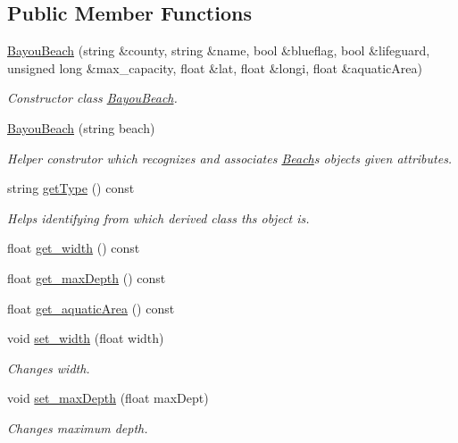 \subsection*{Public Member Functions}
\begin{DoxyCompactItemize}
\item 
\hyperlink{class_bayou_beach_a2d0c9a103748bbb90aaa772daa61f0c7}{Bayou\+Beach} (string \&county, string \&name, bool \&blueflag, bool \&lifeguard, unsigned long \&max\+\_\+capacity, float \&lat, float \&longi, float \&aquatic\+Area)
\begin{DoxyCompactList}\small\item\em Constructor class \hyperlink{class_bayou_beach}{Bayou\+Beach}. \end{DoxyCompactList}\item 
\hyperlink{class_bayou_beach_a8aa2c7bc67df6533807ef7e192ba8147}{Bayou\+Beach} (string beach)
\begin{DoxyCompactList}\small\item\em Helper construtor which recognizes and associates \hyperlink{class_beach}{Beach}\textquotesingle{}s object\textquotesingle{}s given attributes. \end{DoxyCompactList}\item 
string \hyperlink{class_bayou_beach_aad2b96c052075911ae3c0d23fd38b067}{get\+Type} () const
\begin{DoxyCompactList}\small\item\em Helps identifying from which derived class ths object is. \end{DoxyCompactList}\item 
float \hyperlink{class_bayou_beach_a4d4fe4911ac6772ac0335e133de498c8}{get\+\_\+width} () const
\item 
float \hyperlink{class_bayou_beach_a9187c703f1cb4e36831ca5e116ba758a}{get\+\_\+max\+Depth} () const
\item 
float \hyperlink{class_bayou_beach_ae2dc0496a300f7f8828a7b5898a68ee1}{get\+\_\+aquatic\+Area} () const
\item 
void \hyperlink{class_bayou_beach_a4bb316d56e931c219554b63a9ae68136}{set\+\_\+width} (float width)
\begin{DoxyCompactList}\small\item\em Changes width. \end{DoxyCompactList}\item 
void \hyperlink{class_bayou_beach_ada06dbcef6b191fc0413eca4bc5f7b65}{set\+\_\+max\+Depth} (float max\+Dept)
\begin{DoxyCompactList}\small\item\em Changes maximum depth. \end{DoxyCompactList}\item 

\end{DoxyCompactItemize}
